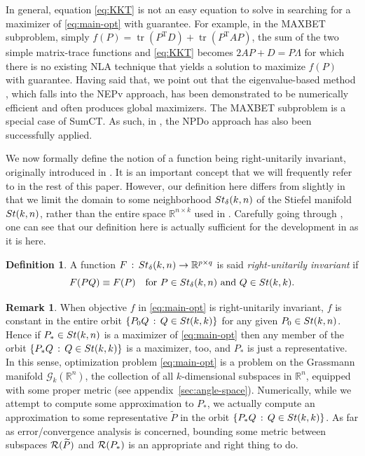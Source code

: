 \documentclass[11pt]{article}
\def\bbR{\mathbb{R}}
\def\scrG{\mathscr{G}}
\def\cR{{\cal R}}
\def\wtd{\widetilde}
\newcommand\STM[2]{{\rm St}(#1,#2)}
\newcommand\STMnbr{{\rm St}_{\delta}(k,n)}
\DeclareMathOperator{\tr}{tr}
\DeclareMathOperator{\T}{T}
\theoremstyle{definition}
\newtheorem{definition}{Definition}[section]
\newtheorem{remark}{Remark}[section]
\numberwithin{equation}{section}
\begin{document}
In general, equation \eqref{eq:KKT} is not an easy equation to solve in searching for a maximizer of \eqref{eq:main-opt} with guarantee. For example,
in the MAXBET subproblem, simply $f(P)=\tr(P^{\T}D)+\tr(P^{\T}AP)$, the sum of the two simple matrix-trace functions
and \eqref{eq:KKT} becomes $2AP+D=P\Lambda$ for which there is no existing
NLA technique that yields a solution to maximize $f(P)$ with guarantee. Having said that, we point out that
the eigenvalue-based method
\cite{zhys:2020}, which falls into the NEPv approach, has been demonstrated to be numerically efficient
\cite{zhys:2020} and often produces global maximizers.
The MAXBET subproblem is a special case of SumCT. As such, in \cite{wazl:2022a}, the NPDo approach has also been
successfully applied.

We now formally define the notion of a function being right-unitarily invariant, originally introduced in \cite{luli:2024}.
It is an important concept that we will frequently
refer to in the rest of this paper. However, our definition here differs from \cite[Definition 2.1]{luli:2024} slightly
in that we limit
the domain  to some neighborhood $\STMnbr$ of the Stiefel manifold $\STM{k}{n}$, rather than the entire
space $\bbR^{n\times k}$ used in \cite{luli:2024}. Carefully going through \cite{luli:2024}, one can see that
our definition here is actually sufficient for the development in \cite{luli:2024} as it is here.

\begin{definition}\label{dfn:UIF}
A function $F\,:\,\STMnbr\to\bbR^{p\times q}$ is said {\em right-unitarily invariant\/} if
$$ %
F(PQ)\equiv F(P)\quad\mbox{for $P\in\STMnbr$ and $Q\in\STM{k}{k}$}.
$$ %
\end{definition}

\begin{remark}\label{rk:right-UI}
When objective $f$ in \eqref{eq:main-opt} is right-unitarily invariant, $f$ is constant in the entire orbit
$\{P_0Q\,:\, Q\in\STM{k}{k}\}$ for any given $P_0\in\STM{k}{n}$. Hence
if $P_*\in\STM{k}{n}$ is a maximizer of \eqref{eq:main-opt} then any member of the orbit
$\{P_*Q\,:\, Q\in\STM{k}{k}\}$ is a maximizer, too, and $P_*$ is just a representative. In this sense, optimization
problem \eqref{eq:main-opt} is a problem on the Grassmann manifold $\scrG_k(\bbR^n)$, the collection of all $k$-dimensional subspaces in $\bbR^n$, equipped with some proper metric (see appendix~\ref{sec:angle-space}).
Numerically, while we attempt to compute some approximation to $P_*$, we actually compute an approximation to
some representative $\wtd P$ in the orbit $\{P_*Q\,:\, Q\in\STM{k}{k}\}$. As far as error/convergence analysis is concerned,
bounding some metric between subspaces $\cR(\wtd P)$ and $\cR(P_*)$ is an appropriate and right thing to do.
\end{remark}
\end{document}
